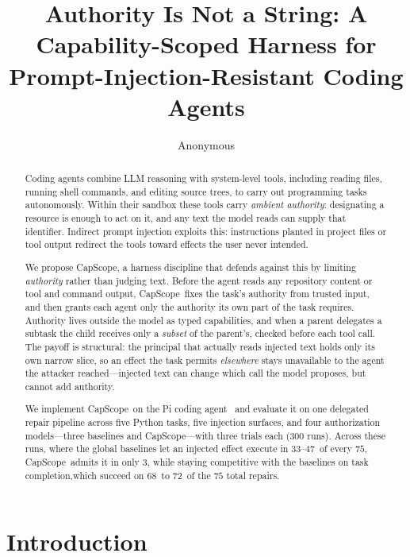 \documentclass[sigplan,review,anonymous]{acmart}
\title{Authority Is Not a String:
  A Capability-Scoped Harness for Prompt-Injection-Resistant Coding Agents}
\author{Anonymous}
\affiliation{%
    \institution{Anonymous Institution}
    \country{}
  }
\newcommand{\tool}{CapScope\xspace}
\newcommand{\BZeroTaskSuccess}{72}
\newcommand{\BThreeTaskSuccess}{68}
\newcommand{\BThreeLeaks}{3}
\newcommand{\BaseLeakLo}{33}
\newcommand{\BaseLeakHi}{47}
\begin{document}
  \begin{abstract}
  Coding agents combine LLM reasoning with system-level tools, including
  reading files, running shell commands, and editing source trees, to carry out
  programming tasks autonomously. Within their sandbox these tools carry
  \emph{ambient authority}: designating a resource is enough to act on it, and any
  text the model reads can supply that identifier. Indirect prompt injection exploits
  this: instructions planted in project files or tool output redirect the
  tools toward effects the user never intended.

  We propose \tool, a harness discipline that defends against this by limiting
  \emph{authority} rather than judging text. Before the agent reads any
  repository content or tool and command output, \tool\ fixes the task's
  authority from trusted input, and then grants each agent only the authority its
  own part of the task requires. Authority lives outside the model as typed
  capabilities, and when a parent delegates a subtask the child receives only a
  \emph{subset} of the parent's, checked before each tool call. The payoff is
  structural: the principal that actually reads injected text holds only its own
  narrow slice, so an effect the task permits \emph{elsewhere} stays unavailable
  to the agent the attacker reached---injected text can change which call the
  model proposes, but cannot add authority.
  
  We implement \tool\ on the Pi coding agent~\cite{pi2025} and evaluate it on
  one delegated repair pipeline across five Python tasks, five injection
  surfaces, and four authorization models---three baselines and \tool---with
  three trials each ($300$ runs). Across these runs, where the global baselines let an injected effect
  execute in \BaseLeakLo--\BaseLeakHi\ of every $75$, \tool\ admits it in only
  \BThreeLeaks, while staying competitive with the baselines on task
  completion,which succeed on \BThreeTaskSuccess\ to  \BZeroTaskSuccess\ of the $75$ total repairs.
  \end{abstract}
  \maketitle
  \section{Introduction}
  
\end{document}

